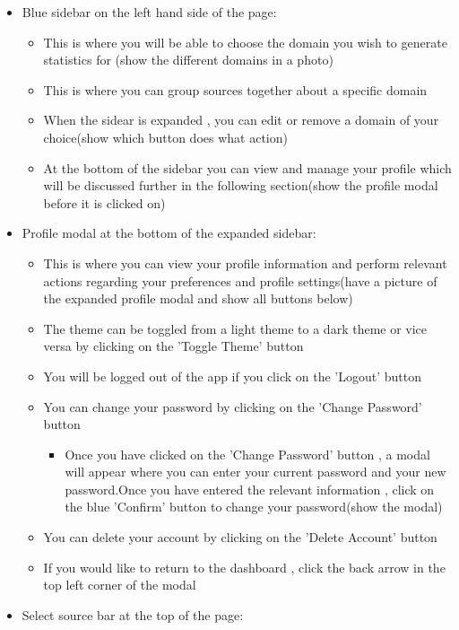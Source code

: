 \documentclass[12pt]{article}
\begin{document}
\begin{itemize}
    \item Blue sidebar on the left hand side of the page:
    \begin{itemize}
        \item This is where you will be able to choose the domain you wish to generate statistics for (show the different domains in a photo)
        \item This is where you can group sources together about a specific domain
        \item When the sidear is expanded , you can edit or remove a domain of your choice(show which button does what action)
        \item At the bottom of the sidebar you can view and manage your profile which will be discussed further in the following section(show the profile modal before it is clicked on)
    \end{itemize}
    \item Profile modal at the bottom of the expanded sidebar:
    \begin{itemize}
        \item This is where you can view your profile information and perform relevant actions regarding your preferences and profile settings(have a picture of the expanded profile modal and show all buttons below)
        \item The theme can be toggled from a light theme to a dark theme or vice versa by clicking on the 'Toggle Theme' button
        \item You will be logged out of the app if you click on the 'Logout' button
        \item You can change your password by clicking on the 'Change Password' button
        \begin{itemize}
            \item Once you have clicked on the 'Change Password' button , a modal will appear where you can enter your current password and your new password.Once you have entered the relevant information , click on the blue 'Confirm' button to change your password(show the modal)
        \end{itemize}
        \item You can delete your account by clicking on the 'Delete Account' button
        \item If you would like to return to the dashboard , click the back arrow in the top left corner of the modal
    \end{itemize}
    \item Select source bar at the top of the page:

\end{itemize}
\end{document}
